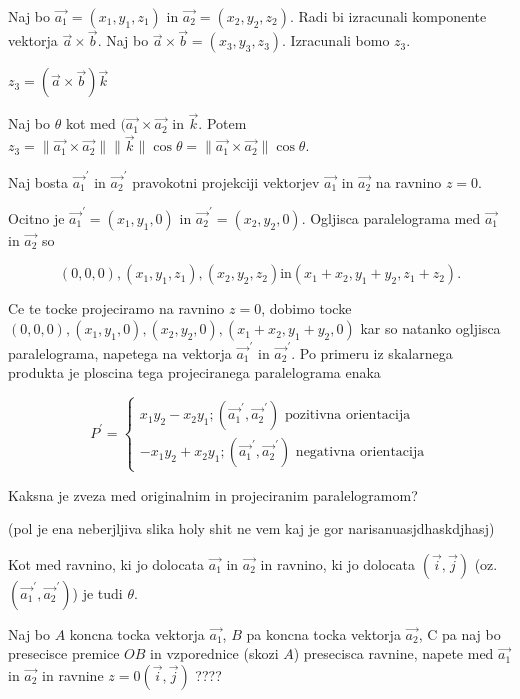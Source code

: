 \documentclass{report}
\begin{document}

Naj bo $\vec{a_1} = (x_1,y_1,z_1)$ in $\vec{a_2} = (x_2,y_2,z_2)$. Radi bi izracunali komponente vektorja $\vec{a} \times \vec{b}$.
Naj bo $\vec{a} \times \vec{b} = (x_3,y_3,z_3)$. Izracunali bomo $z_3$.

$z_3 = (\vec{a} \times \vec{b}) \vec{k}$

Naj bo $\theta$ kot med $(\vec{a_1} \times \vec{a_2}$ in $\vec{k}$. Potem $z_3 = \| \vec{a_1} \times \vec{a_2}  \| \|\vec{k}\| \cos \theta = \|\vec{a_1} \times \vec{a_2}\| \cos \theta$.

Naj bosta $\vec{a_1}^{\prime}$ in $\vec{a_2}^{\prime}$ pravokotni projekciji vektorjev $\vec{a_1}$ in $\vec{a_2}$ na ravnino $z=0$.


Ocitno je $\vec{a_1}^{\prime} = (x_1,y_1, 0)$ in $\vec{a_2}^{\prime} = (x_2,y_2,0)$. Ogljisca paralelograma med $\vec{a_1}$ in $\vec{a_2}$ so

\[
	(0,0,0), (x_1,y_1,z_1), (x_2,y_2,z_2) \text{in} (x_1 + x_2, y_1 + y_2, z_1 + z_2)
.\]


Ce te tocke projeciramo na ravnino $z=0$, dobimo tocke  $(0,0,0), (x_1,y_1,0), (x_2,y_2,0), (x_1 + x_2, y_1 + y_2,0)$ kar so natanko ogljisca paralelograma, napetega na vektorja $\vec{a_1}^{\prime}$ in $\vec{a_2}^{\prime}$. Po primeru iz skalarnega produkta je ploscina tega projeciranega paralelograma enaka

\[
P^{\prime} = \begin{cases}
	x_1 y_2 - x_2 y_1 ; (\vec{a_1}^{\prime}, \vec{a_2}^{\prime}) \text{  pozitivna orientacija} \\
	-x_1 y_2 + x_2 y_1 ; (\vec{a_1}^{\prime}, \vec{a_2}^{\prime}) \text{  negativna orientacija}
	\end{cases}
\]

Kaksna je zveza med originalnim in projeciranim paralelogramom?



(pol je ena neberjljiva slika holy shit ne vem kaj je gor narisanuasjdhaskdjhasj)



Kot med ravnino, ki jo dolocata $\vec{a_1}$ in $\vec{a_2}$ in ravnino, ki jo dolocata $(\vec{i}, \vec{j})$ (oz. $(\vec{a_1}^{\prime},\vec{a_2}^{\prime})$) je tudi $\theta$.

Naj bo $A$ koncna tocka vektorja  $\vec{a_1}$, $B$ pa koncna tocka vektorja  $\vec{a_2}$, C pa naj bo presecisce premice $OB$ in vzporednice (skozi  $A$) presecisca ravnine, napete med  $\vec{a_1}$ in $\vec{a_2}$ in ravnine $z=0 (\vec{i}, \vec{j})$ ????
\end{document}
